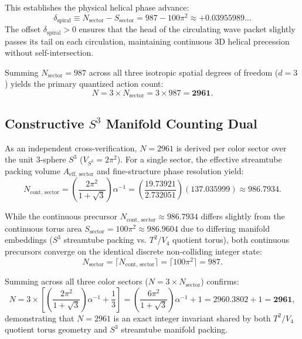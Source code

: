 \documentclass[11pt,a4paper]{article}
\begin{document}
	This establishes the physical helical phase advance:
	\begin{equation}
		\delta_{\text{spiral}} \equiv N_{\text{sector}} - S_{\text{sector}} = 987 - 100\pi^2 \approx +0.03955989\dots
		\label{eq:delta_spiral_physical}
	\end{equation}
	The offset $\delta_{\text{spiral}} > 0$ ensures that the head of the circulating wave packet slightly passes its tail on each circulation, maintaining continuous 3D helical precession without self-intersection.
	
	Summing $N_{\text{sector}} = 987$ across all three isotropic spatial degrees of freedom ($d = 3$) yields the primary quantized action count:
	\begin{equation}
		N = 3 \times N_{\text{sector}} = 3 \times 987 = \mathbf{2961}.
		\label{eq:N_total_final_forward}
	\end{equation}
	
	\subsection{Constructive $S^3$ Manifold Counting Dual}
	\label{sec:S3_manifold_dual}
	
	As an independent cross-verification, $N = 2961$ is derived per color sector over the unit 3-sphere $S^3$ ($V_{S^3} = 2\pi^2$). For a single sector, the effective streamtube packing volume $A_{\text{eff, sector}}$ and fine-structure phase resolution yield:
	\begin{equation}
		N_{\text{cont, sector}} = \left(\frac{2\pi^2}{1 + \sqrt{3}}\right) \alpha^{-1} = \left(\frac{19.73921}{2.732051}\right) (137.035999) \approx 986.7934.
		\label{eq:per_sector_S3}
	\end{equation}
	
	While the continuous precursor $N_{\text{cont, sector}} \approx 986.7934$ differs slightly from the continuous torus area $S_{\text{sector}} = 100\pi^2 \approx 986.9604$ due to differing manifold embeddings ($S^3$ streamtube packing vs. $T^2/V_4$ quotient torus), both continuous precursors converge on the identical discrete non-colliding integer state:
	\begin{equation}
		N_{\text{sector}} = \lceil N_{\text{cont, sector}} \rceil = \lceil 100\pi^2 \rceil = 987.
	\end{equation}
	
	Summing across all three color sectors ($N = 3 \times N_{\text{sector}}$) confirms:
	\begin{equation}
		N = 3 \times \left[ \left(\frac{2\pi^2}{1 + \sqrt{3}}\right) \alpha^{-1} + \frac{1}{3} \right] = \left(\frac{6\pi^2}{1 + \sqrt{3}}\right) \alpha^{-1} + 1 = 2960.3802 + 1 = \mathbf{2961},
		\label{eq:N_reconciled_final_patch}
	\end{equation}
	demonstrating that $N = 2961$ is an exact integer invariant shared by both $T^2/V_4$ quotient torus geometry and $S^3$ streamtube manifold packing.
	
\end{document}
